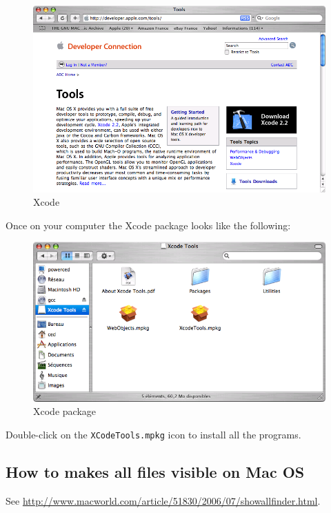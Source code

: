 \begin{figure}[!h]
\begin{center}
\includegraphics[width=15cm]{resources/img/fig-mac4.png}
\caption{Xcode\label{fig-mac4}}
\end{center}
\end{figure}


\bigskip
\noindent Once on your computer the Xcode package looks like the following:

\begin{figure}[!h]
\begin{center}
\includegraphics[width=14cm]{resources/img/fig-mac5.png}
\caption{Xcode package\label{fig-mac5}}
\end{center}
\end{figure}


\bigskip
\noindent Double-click on the \verb+XCodeTools.mpkg+ icon to install all the
programs.


\subsection{How to makes all files visible on Mac OS}
\noindent See
\url{http://www.macworld.com/article/51830/2006/07/showallfinder.html}.

